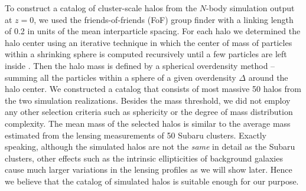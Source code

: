 \documentclass[iop, apj]{emulateapj}
\newcommand{\?}{\stackrel{?}{=}}
\begin{document}
To construct a catalog of cluster-scale halos from the $N$-body
simulation output at $z=0$, we used the friends-of-friends (FoF) group
finder \citep[e.g.][]{Davisetal:85} with a linking length of 0.2 in
units of the mean interparticle spacing. For each halo we
determined the halo center using an iterative technique in which the
center of mass of particles within a shrinking sphere is computed
recursively until a few particles are left inside
\citep[e.g.][]{Poweretal:03,Masakietal:13}. Then the halo mass is
defined by a spherical overdensity method -- summing all the particles
within a sphere of a given overdensity $\Delta$ around the halo center.
We constructed a catalog that consists of most massive 50 halos from the
two simulation realizations. Besides the mass threshold, we did not
employ any other selection criteria such as sphericity or the degree of
mass distribution complexity. The mean mass of the selected halos is
similar to the average mass estimated from the lensing measurements of
50 Subaru clusters.  Exactly speaking, although the simulated halos are
not the {\it same} in detail as the Subaru clusters, other effects such
as the intrinsic ellipticities of background galaxies cause much larger
variations in the lensing profiles as we will show later. Hence we
believe that the catalog of simulated halos is suitable enough for our
purpose.
\end{document}

